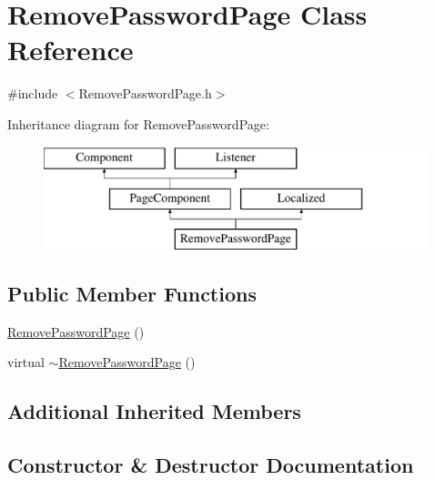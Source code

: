 \hypertarget{classRemovePasswordPage}{}\section{Remove\+Password\+Page Class Reference}
\label{classRemovePasswordPage}


{\ttfamily \#include $<$Remove\+Password\+Page.\+h$>$}

Inheritance diagram for Remove\+Password\+Page\+:\begin{figure}[H]
\begin{center}
\leavevmode
\includegraphics[height=3.000000cm]{classRemovePasswordPage}
\end{center}
\end{figure}
\subsection*{Public Member Functions}
\begin{DoxyCompactItemize}
\item 
\mbox{\hyperlink{classRemovePasswordPage_aa1e7a665c1d12a8b3fc034bee98e8e7a}{Remove\+Password\+Page}} ()
\item 
virtual \mbox{\hyperlink{classRemovePasswordPage_a0283a1f0c381359d2fcec91d08deb9ce}{$\sim$\+Remove\+Password\+Page}} ()
\end{DoxyCompactItemize}
\subsection*{Additional Inherited Members}


\subsection{Constructor \& Destructor Documentation}
\mbox{\label{classRemovePasswordPage_aa1e7a665c1d12a8b3fc034bee98e8e7a}} 
